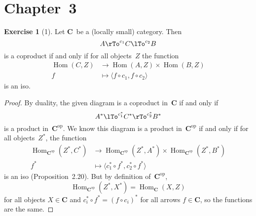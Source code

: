\documentclass[letterpaper,12pt]{article}
\newcommand{\after}{\circ}
\DeclareMathOperator{\Hom}{Hom}
\newcommand{\pair}[2]{\langle{#1},{#2}\rangle}
\renewcommand{\star}[1]{#1^{*}}
\newcommand{\cat}[1]{\mathbf{#1}}
\newcommand{\dual}[1]{#1^{\mathrm{op}}}
\newcommand{\C}{\cat{C}}
\newcommand{\Cop}{\dual{\C}}
\theoremstyle{definition}
\newtheorem*{exer}{Exercise}
\theoremstyle{remark}
\theoremstyle{direction}
\begin{document}
\section*{Chapter~3}
\begin{exer}[1]
Let \(\C\)~be a (locally small) category. Then
\[A\rTo^{c_1}C\lTo^{c_2}B\]
is a coproduct if and only if for all objects~\(Z\) the function
\begin{align*}
\Hom(C,Z)&\to\Hom(A,Z)\times\Hom(B,Z)\\
f&\mapsto\pair{f\after c_1}{f\after c_2}
\end{align*}
is an iso.
\end{exer}
\begin{proof}
By duality, the given diagram is a coproduct in~\(\C\) if and only if
\[\star{A}\lTo^{\star{c_1}}\star{C}\rTo^{\star{c_2}}\star{B}\]
is a product in~\(\Cop\). We know this diagram is a product in~\(\Cop\) if and only if for all objects~\(\star{Z}\), the function
\begin{align*}
\Hom_{\Cop}(\star{Z},\star{C})&\to\Hom_{\Cop}(\star{Z},\star{A})\times\Hom_{\Cop}(\star{Z},\star{B})\\
\star{f}&\mapsto\pair{\star{c_1}\after\star{f}}{\star{c_2}\after\star{f}}
\end{align*}
is an iso (Proposition~2.20). But by definition of~\(\Cop\),
\[\Hom_{\Cop}(\star{Z},\star{X})=\Hom_{\C}(X,Z)\]
for all objects \(X\in\C\) and \(\star{c_i}\after\star{f}=\star{(f\after c_i)}\) for all arrows \(f\in\C\), so the functions are the same.
\end{proof}
\end{document}
